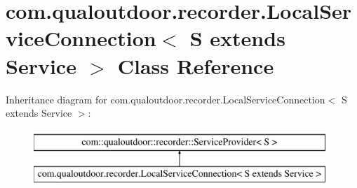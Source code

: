 \hypertarget{classcom_1_1qualoutdoor_1_1recorder_1_1LocalServiceConnection_3_01S_01extends_01Service_01_4}{\section{com.\-qualoutdoor.\-recorder.\-Local\-Service\-Connection$<$ S extends Service $>$ Class Reference}
\label{classcom_1_1qualoutdoor_1_1recorder_1_1LocalServiceConnection_3_01S_01extends_01Service_01_4}
}
Inheritance diagram for com.\-qualoutdoor.\-recorder.\-Local\-Service\-Connection$<$ S extends Service $>$\-:\begin{figure}[H]
\begin{center}
\leavevmode
\includegraphics[height=2.000000cm]{classcom_1_1qualoutdoor_1_1recorder_1_1LocalServiceConnection_3_01S_01extends_01Service_01_4}
\end{center}
\end{figure}
